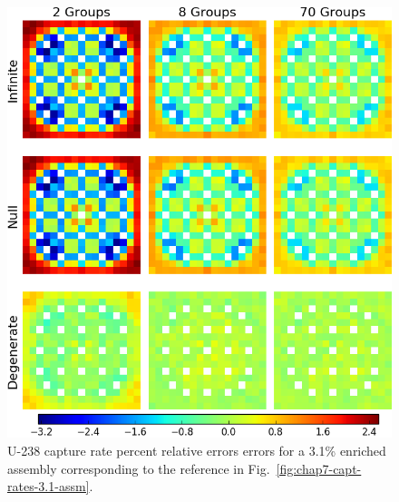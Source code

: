 \clearpage

\begin{figure}[h!]
\centering
\includegraphics[width=\linewidth]{figures/quantification/assm-31/capt-err}
\caption[U-238 capture rate errors for a 3.1\% enriched assembly]{U-238 capture rate percent relative errors errors for a 3.1\% enriched assembly corresponding to the reference in Fig.~\ref{fig:chap7-capt-rates-3.1-assm}.}
\label{fig:chap8-assm-3.1-capt-err}
\end{figure}

\clearpage

